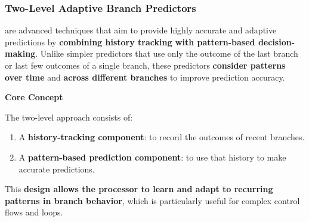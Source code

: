 \subsubsection{Two-Level Adaptive Branch Predictors}

 are advanced techniques that aim to provide highly accurate and adaptive predictions by \textbf{combining history tracking with pattern-based decision-making}. Unlike simpler predictors that use only the outcome of the last branch or last few outcomes of a single branch, these predictors \textbf{consider patterns over time} and \textbf{across different branches} to improve prediction accuracy.

\highspace
\begin{flushleft}
    \textcolor{Green3}{ \textbf{Core Concept}}
\end{flushleft}
The two-level approach consists of:
\begin{enumerate}
    \item A \textbf{history-tracking component}: to record the outcomes of recent branches.
    \item A \textbf{pattern-based prediction component}: to use that history to make accurate predictions.
\end{enumerate}
This \textbf{design allows the processor to learn and adapt to recurring patterns in branch behavior}, which is particularly useful for complex control flows and loops.

